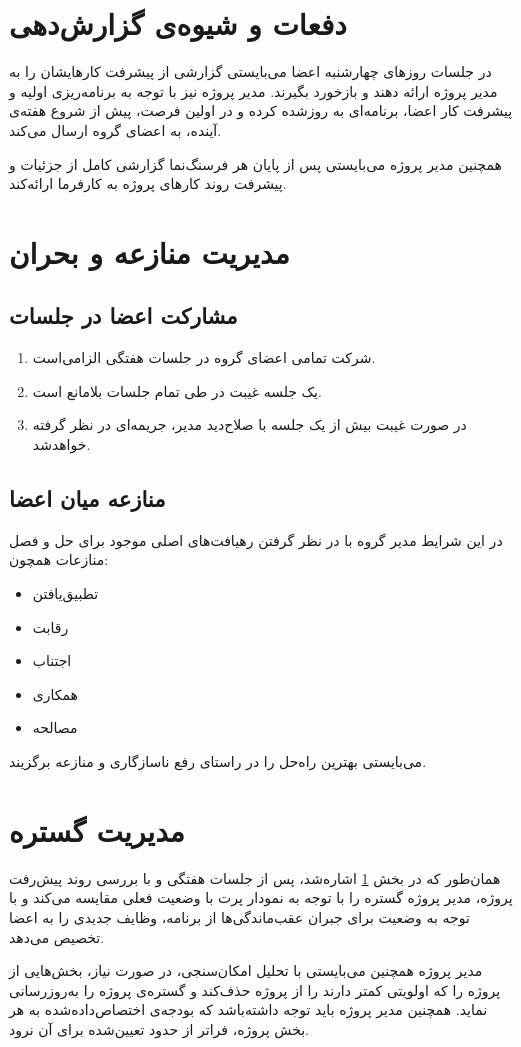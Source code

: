 \section{دفعات و شیوه‌ی گزارش‌دهی}
\label{دفعات و شیوه‌ی گزارش‌دهی}
در جلسات روزهای 
چهارشنبه
اعضا می‌بایستی گزارشی از پیشرفت کارهایشان را به مدیر پروژه ارائه دهند و بازخورد بگیرند.
مدیر پروژه نیز با توجه به برنامه‌ریزی اولیه و پیشرفت کار اعضا، برنامه‌ای به روزشده  کرده و در اولین فرصت، پیش از شروع هفته‌ی آینده، به اعضای گروه ارسال می‌کند.

همچنین مدیر پروژه می‌بایستی پس از پایان هر فرسنگ‌نما
گزارشی کامل از جزئیات و پیشرفت روند کارهای پروژه به کارفرما ارائه‌کند.
\section{مدیریت منازعه و بحران}
\subsection{مشارکت اعضا در جلسات}
\begin{enumerate}
	\item
	شرکت تمامی اعضای گروه در جلسات هفتگی الزامی‌است.
	\item 
	یک جلسه غیبت در طی تمام جلسات بلامانع است.
	\item
	در صورت غیبت بیش از یک جلسه با صلاح‌دید مدیر، 
	جریمه‌ای در نظر گرفته خواهدشد.
\end{enumerate}

\subsection{منازعه میان اعضا}
در این شرایط مدیر گروه با در نظر گرفتن رهیافت‌های اصلی موجود برای حل و فصل منازعات همچون:
\begin{itemize}
	\item
	تطبیق‌یافتن
	\item 
	رقابت
	\item 
	اجتناب
		\item 
	همکاری
		\item 
	مصالحه
\end{itemize}
می‌بایستی بهترین راه‌حل را در راستای رفع ناسازگاری و منازعه برگزیند.
\section{مدیریت گستره}
همان‌طور که در بخش 
\ref{دفعات و شیوه‌ی گزارش‌دهی}
اشاره‌شد، پس از جلسات هفتگی و با بررسی روند پیش‌رفت پروژه، مدیر پروژه گستره را با توجه به نمودار پرت با وضعیت فعلی مقایسه می‌کند و با توجه به وضعیت برای جبران عقب‌ماندگی‌ها از برنامه، وظایف جدیدی را به اعضا تخصیص می‌دهد.

مدیر پروژه همچنین می‌بایستی با تحلیل امکان‌سنجی، در صورت نیاز، بخش‌هایی از پروژه را که اولویتی کمتر دارند را از پروژه حذف‌کند و گستره‌ی پروژه را به‌روزرسانی نماید. همچنین مدیر پروژه باید توجه داشته‌باشد که بودجه‌ی اختصاص‌داده‌شده به هر بخش پروژه، فراتر از حدود تعیین‌شده برای آن نرود.
